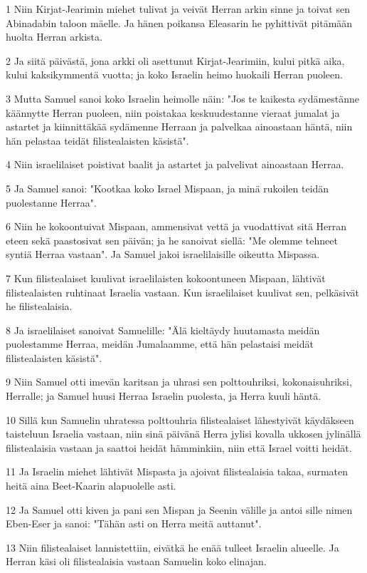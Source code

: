 \par 1 Niin Kirjat-Jearimin miehet tulivat ja veivät Herran arkin sinne ja toivat sen Abinadabin taloon mäelle. Ja hänen poikansa Eleasarin he pyhittivät pitämään huolta Herran arkista.
\par 2 Ja siitä päivästä, jona arkki oli asettunut Kirjat-Jearimiin, kului pitkä aika, kului kaksikymmentä vuotta; ja koko Israelin heimo huokaili Herran puoleen.
\par 3 Mutta Samuel sanoi koko Israelin heimolle näin: "Jos te kaikesta sydämestänne käännytte Herran puoleen, niin poistakaa keskuudestanne vieraat jumalat ja astartet ja kiinnittäkää sydämenne Herraan ja palvelkaa ainoastaan häntä, niin hän pelastaa teidät filistealaisten käsistä".
\par 4 Niin israelilaiset poistivat baalit ja astartet ja palvelivat ainoastaan Herraa.
\par 5 Ja Samuel sanoi: "Kootkaa koko Israel Mispaan, ja minä rukoilen teidän puolestanne Herraa".
\par 6 Niin he kokoontuivat Mispaan, ammensivat vettä ja vuodattivat sitä Herran eteen sekä paastosivat sen päivän; ja he sanoivat siellä: "Me olemme tehneet syntiä Herraa vastaan". Ja Samuel jakoi israelilaisille oikeutta Mispassa.
\par 7 Kun filistealaiset kuulivat israelilaisten kokoontuneen Mispaan, lähtivät filistealaisten ruhtinaat Israelia vastaan. Kun israelilaiset kuulivat sen, pelkäsivät he filistealaisia.
\par 8 Ja israelilaiset sanoivat Samuelille: "Älä kieltäydy huutamasta meidän puolestamme Herraa, meidän Jumalaamme, että hän pelastaisi meidät filistealaisten käsistä".
\par 9 Niin Samuel otti imevän karitsan ja uhrasi sen polttouhriksi, kokonaisuhriksi, Herralle; ja Samuel huusi Herraa Israelin puolesta, ja Herra kuuli häntä.
\par 10 Sillä kun Samuelin uhratessa polttouhria filistealaiset lähestyivät käydäkseen taisteluun Israelia vastaan, niin sinä päivänä Herra jylisi kovalla ukkosen jylinällä filistealaisia vastaan ja saattoi heidät hämminkiin, niin että Israel voitti heidät.
\par 11 Ja Israelin miehet lähtivät Mispasta ja ajoivat filistealaisia takaa, surmaten heitä aina Beet-Kaarin alapuolelle asti.
\par 12 Ja Samuel otti kiven ja pani sen Mispan ja Seenin välille ja antoi sille nimen Eben-Eser ja sanoi: "Tähän asti on Herra meitä auttanut".
\par 13 Niin filistealaiset lannistettiin, eivätkä he enää tulleet Israelin alueelle. Ja Herran käsi oli filistealaisia vastaan Samuelin koko elinajan.
